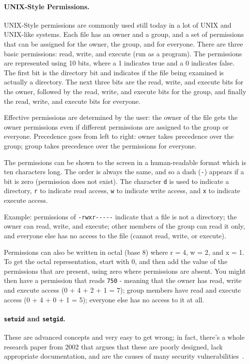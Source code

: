 \paragraph{UNIX-Style Permissions.}
UNIX-Style permissions are commonly used still today in a lot of UNIX and UNIX-like systems. Each file has an owner and a group, and a set of permissions that can be assigned for the owner, the group, and for everyone. There are three basic permissions: read, write, and execute (run as a program). The permissions are represented using 10 bits, where a 1 indicates true and a 0 indicates false. The first bit is the directory bit and indicates if the file being examined is actually a directory. The next three bits are the read, write, and execute bits for the owner, followed by the read, write, and execute bits for the group, and finally the read, write, and execute bits for everyone.

Effective permissions are determined by the user: the owner of the file gets the owner permissions even if different permissions are assigned to the group or everyone. Precedence goes from left to right: owner takes precedence over the group; group takes precedence over the permissions for everyone.

The permissions can be shown to the screen in a human-readable format which is ten characters long. The order is always the same, and so a dash (\texttt{-}) appears if a bit is zero (permission does not exist). The character \texttt{d} is used to indicate a directory, \texttt{r} to indicate read access, \texttt{w} to indicate write access, and \texttt{x} to indicate execute access.

Example: permissions of \texttt{-rwxr{-}{-}{-}{-}{-}} indicate that a file is not a directory; the owner can read, write, and execute; other members of the group can read it only, and everyone else has no access to the file (cannot read, write, or execute). 

Permissions can also be written in octal (base 8) where r = 4, w = 2, and x = 1. To get the octal representation, start with 0, and then add the value of the  permissions that are present, using zero where permissions are absent. You might then have a permission that reads \texttt{750} - meaning that the owner has read, write and execute access (0 + 4 + 2 + 1 = 7); group members have read and execute access (0 + 4 + 0 + 1 = 5); everyone else has no access to it at all.

\paragraph{\texttt{setuid} and \texttt{setgid}.}
These are advanced concepts and very easy to get wrong; in fact, there's a whole research paper from 2002 that argues that these are poorly designed, lack appropriate documentation, and are the causes of many security vulnerabilities~\cite{270566}.

